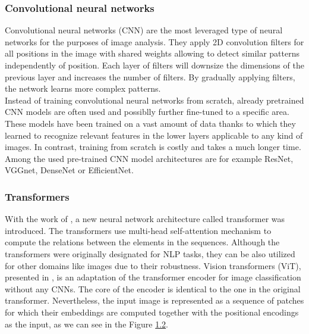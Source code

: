 \subsubsection{Convolutional neural networks}
Convolutional neural networks (CNN)\citep{o2015introduction} are the most leveraged type of neural networks for the purposes of image analysis. They apply 2D convolution filters for all positions in the image with shared weights allowing to detect similar patterns independently of position. Each layer of filters will downsize the dimensions of the previous layer and increases the number of filters. By gradually applying filters, the network learns more complex patterns.\\

Instead of training convolutional neural networks from scratch, already pretrained CNN models are often used and possiblly further fine-tuned to a specific area. These models have been trained on a vast amount of data thanks to which they learned to recognize relevant features in the lower layers applicable to any kind of images. In contrast, training from scratch is costly and takes a much longer time. Among the used pre-trained CNN model architectures are for example ResNet\citep{he2016deep}, VGGnet\citep{simonyan2014very}, DenseNet\citep{huang2017densely} or EfficientNet\citep{tan2019efficientnet}.

\subsubsection{Transformers}
\label{sec:transformersEncoder}
With the work of \citet{vaswani2017attention}, a new neural network architecture called transformer was introduced. The transformers use multi-head self-attention mechanism to compute the relations between the elements in the sequences. Although the transformers were originally designated for NLP tasks, they can be also utilized for other domains like images due to their robustness. Vision transformers (ViT), presented in \citet{dosovitskiy2020image}, is an adaptation of the transformer encoder for image classification without any CNNs. The core of the encoder is identical to the one in the original transformer. Nevertheless, the input image is represented as a sequence of patches for which their embeddings are computed together with the positional encodings as the input, as we can see in the Figure \hyperref[fig02:ViT]{1.2}.

